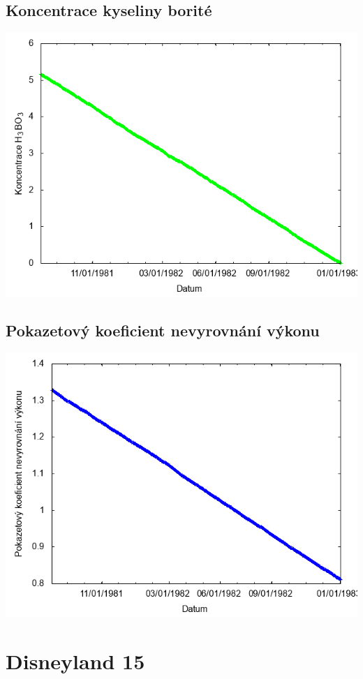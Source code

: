 \documentclass[a4paper,twoside,11pt]{article}
\begin{document}
\subsection*{Koncentrace kyseliny borité}
\begin{center}
\includegraphics[width=.8\textwidth]{graphs/Disneyland_14_bc.png}
\end{center}

\subsection*{Pokazetový koeficient nevyrovnání výkonu}
\begin{center}
\includegraphics[width=.8\textwidth]{graphs/Disneyland_14_fha.png}
\end{center}

\newpage
\section*{Disneyland 15}
\end{document}
